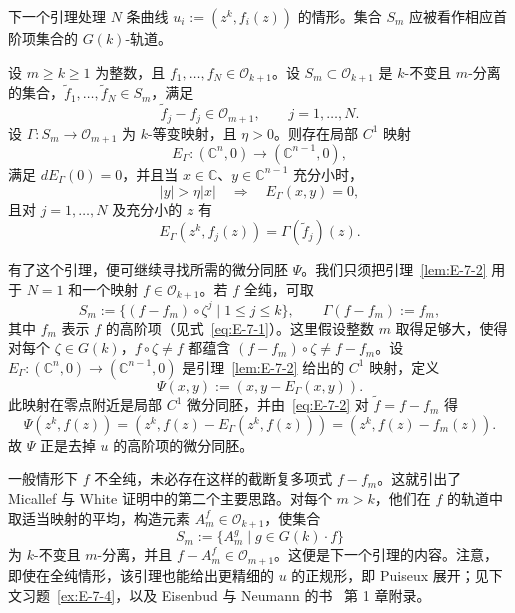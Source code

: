 下一个引理处理 $N$ 条曲线 $u_i:=(z^k,f_i(z))$ 的情形。集合 $S_m$ 应被看作相应首阶项集合的 $G(k)$-轨道。

\begin{lemma}\label{lem:E-7-2}
设 $m\ge k\ge1$ 为整数，且 $f_1,\ldots,f_N\in\mathcal O_{k+1}$。设 $S_m\subset\mathcal O_{k+1}$ 是 $k$-不变且 $m$-分离的集合，$\widetilde f_1,\ldots,\widetilde f_N\in S_m$，满足
\[
  \widetilde f_j-f_j\in\mathcal O_{m+1},\qquad j=1,\ldots,N.
\]
设 $\Gamma:S_m\to\mathcal O_{m+1}$ 为 $k$-等变映射，且 $\eta>0$。则存在局部 $C^1$ 映射
\[
  E_\Gamma:(\mathbb C^n,0)\to(\mathbb C^{n-1},0),
\]
满足 $dE_\Gamma(0)=0$，并且当 $x\in\mathbb C$、$y\in\mathbb C^{n-1}$ 充分小时，
\[
  |y|>\eta|x|\quad\Longrightarrow\quad E_\Gamma(x,y)=0,
\]
且对 $j=1,\ldots,N$ 及充分小的 $z$ 有
\begin{equation}\label{eq:E-7-2}
  E_\Gamma(z^k,f_j(z))=\Gamma(\widetilde f_j)(z).
\end{equation}
\end{lemma}

有了这个引理，便可继续寻找所需的微分同胚 $\Psi$。我们只须把引理~\ref{lem:E-7-2} 用于 $N=1$ 和一个映射 $f\in\mathcal O_{k+1}$。若 $f$ 全纯，可取
\[
  S_m:=\{(f-f_m)\circ\zeta^j\mid1\le j\le k\},
  \qquad \Gamma(f-f_m):=f_m,
\]
其中 $f_m$ 表示 $f$ 的高阶项（见式~\eqref{eq:E-7-1}）。这里假设整数 $m$ 取得足够大，使得对每个 $\zeta\in G(k)$，$f\circ\zeta\ne f$ 都蕴含 $(f-f_m)\circ\zeta\ne f-f_m$。设 $E_\Gamma:(\mathbb C^n,0)\to(\mathbb C^{n-1},0)$ 是引理~\ref{lem:E-7-2} 给出的 $C^1$ 映射，定义
\[
  \Psi(x,y):=(x,y-E_\Gamma(x,y)).
\]
此映射在零点附近是局部 $C^1$ 微分同胚，并由~\eqref{eq:E-7-2} 对 $\widetilde f=f-f_m$ 得
\[
  \Psi(z^k,f(z))=(z^k,f(z)-E_\Gamma(z^k,f(z)))
  =(z^k,f(z)-f_m(z)).
\]
故 $\Psi$ 正是去掉 $u$ 的高阶项的微分同胚。

一般情形下 $f$ 不全纯，未必存在这样的截断复多项式 $f-f_m$。这就引出了 Micallef 与 White 证明中的第二个主要思路。对每个 $m>k$，他们在 $f$ 的轨道中取适当映射的平均，构造元素 $A_m^f\in\mathcal O_{k+1}$，使集合
\[
  S_m:=\{A_m^g\mid g\in G(k)\cdot f\}
\]
为 $k$-不变且 $m$-分离，并且 $f-A_m^f\in\mathcal O_{m+1}$。这便是下一个引理的内容。注意，即使在全纯情形，该引理也能给出更精细的 $u$ 的正规形，即 Puiseux 展开；见下文习题~\ref{ex:E-7-4}，以及 Eisenbud 与 Neumann 的书~ 第 1 章附录。

